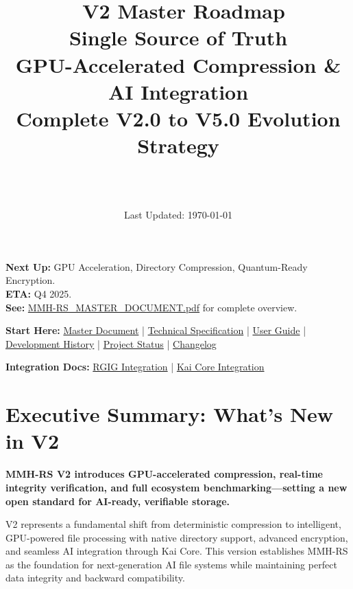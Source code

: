 \documentclass[12pt,a4paper]{article}
\title{\Huge\textbf{\project\ V2 Master Roadmap}\\[0.5cm]
\Large\textbf{Single Source of Truth}\\[0.3cm]
\large GPU-Accelerated Compression \& AI Integration\\[0.5cm]
\large Complete V2.0 to V5.0 Evolution Strategy}
\author{\Large\authorname\\[0.2cm]\email\\[0.2cm]\github}
\date{\large Last Updated: \today}
\begin{document}
\maketitle
\thispagestyle{empty}

\begin{tcolorbox}[colback=orange!10,colframe=orange!50,title=\textbf{V2 GPU/Quantum Features in Active Development}]
\textbf{Next Up:} GPU Acceleration, Directory Compression, Quantum-Ready Encryption.\\
\textbf{ETA:} Q4 2025.\\
\textbf{See:} \href{MMH-RS_MASTER_DOCUMENT.pdf}{MMH-RS\_MASTER\_DOCUMENT.pdf} for complete overview.
\end{tcolorbox}

\begin{tcolorbox}[colback=blue!10,colframe=blue!50,title=\textbf{Full Documentation Suite}]
\textbf{Start Here:} \href{MMH-RS_MASTER_DOCUMENT.pdf}{Master Document} | \href{MMH-RS_TECHNICAL_COMPLETE.pdf}{Technical Specification} | \href{USER_GUIDE.md}{User Guide} | \href{DEVELOPMENT_HISTORY.md}{Development History} | \href{PROJECT_STATUS.md}{Project Status} | \href{CHANGELOG.md}{Changelog}

\textbf{Integration Docs:} \href{RGIG_INTEGRATION_COMPLETE.pdf}{RGIG Integration} | \href{KAI_CORE_INTEGRATION_COMPLETE.pdf}{Kai Core Integration}
\end{tcolorbox}

\tableofcontents
\newpage

\section{Executive Summary: What's New in V2}

\begin{tcolorbox}[colback=v2blue!10,colframe=v2blue!50,title=\textbf{MMH-RS V2 Executive Summary}]
\textbf{MMH-RS V2 introduces GPU-accelerated compression, real-time integrity verification, and full ecosystem benchmarking—setting a new open standard for AI-ready, verifiable storage.}

V2 represents a fundamental shift from deterministic compression to intelligent, GPU-powered file processing with native directory support, advanced encryption, and seamless AI integration through Kai Core. This version establishes MMH-RS as the foundation for next-generation AI file systems while maintaining perfect data integrity and backward compatibility.
\end{tcolorbox}
\end{document}

